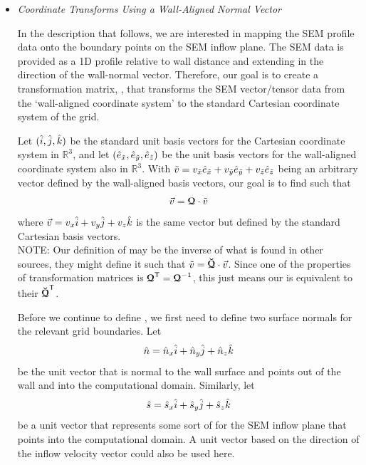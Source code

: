 
\begin{itemize}[parsep=2.5\parsep]


  \item \textit{Coordinate Transforms Using a Wall-Aligned Normal Vector}

    In the description that follows, we are interested in mapping the SEM
    profile data onto the boundary points on the SEM inflow plane.
    The SEM data is provided as a 1D profile relative to wall distance and
    extending in the direction of the wall-normal vector.
    Therefore, our goal is to create a transformation matrix, \rmat, that
    transforms the SEM vector\slash tensor data from the `wall-aligned
    coordinate system' to the standard Cartesian coordinate system of the grid.


    Let \((\hat{i},\hat{j},\hat{k})\) be the standard unit basis vectors for the
    Cartesian coordinate system in \(\mathbb{R}^3\), and let
    \((\hat{e}_{\tilde{x}},\hat{e}_{\tilde{y}},\hat{e}_{\tilde{z}})\) be the unit basis vectors for the wall-aligned
    coordinate system also in \(\mathbb{R}^3\).
    With \(\tilde{v}=v_{\tilde{x}}\hat{e}_{\tilde{x}}+v_{\tilde{y}}\hat{e}_{\tilde{y}}+v_{\tilde{z}}\hat{e}_{\tilde{z}}\) being an
    arbitrary vector defined by the wall-aligned basis vectors, our goal is to
    find \rmat{} such that \[\vec{v}=\bm{\mathcal{Q}}\cdot\tilde{v}\] where
    \(\vec{v}=v_x\hat{i}+v_y\hat{j}+v_z\hat{k}\) is the same vector but defined by the
    standard Cartesian basis vectors.\\
    NOTE:
    Our definition of \rmat{} may be the inverse of what is found in other
    sources, \thatis they might define it such that
    $\tilde{v}=\bm{\breve{\mathcal{Q}}}\cdot\vec{v}$.
    Since one of the properties of transformation matrices is
    $\bm{\mathcal{Q}}^{\mathsf{T}}=\bm{\mathcal{Q}}^{-1}$,
    this just means our \rmat{} is equivalent to their
    $\bm{\breve{\mathcal{Q}}}^{\mathsf{T}}$.
    

    Before we continue to define \rmat, we first need to define two surface
    normals for the relevant grid boundaries.
    Let \[\hat{n}=\hat{n}_x\hat{i}+\hat{n}_y\hat{j}+\hat{n}_z\hat{k}\] be the unit vector that is normal to
    the wall surface and points out of the wall and into the computational
    domain.
    Similarly, let \[\hat{s}=\hat{s}_x\hat{i}+\hat{s}_y\hat{j}+\hat{s}_z\hat{k}\] be a
    unit vector that represents some sort of 
    for the SEM inflow plane that points into the computational domain.
    A unit vector based on the direction of the inflow velocity vector could
    also be used here.
    

\end{itemize}
